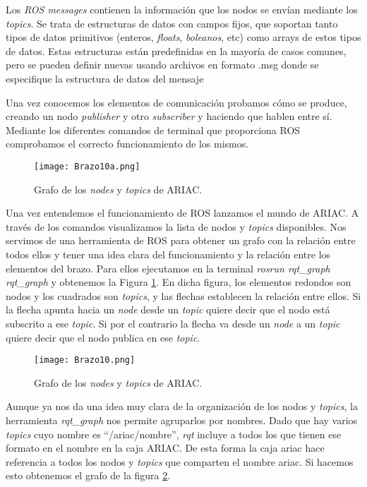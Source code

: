 Los \textit{ROS messages} contienen la información que los nodos se envían mediante los \textit{topics}. Se trata de estructuras de datos con campos fijos, que soportan tanto tipos de datos primitivos (enteros, \textit{floats}, \textit{boleanos}, etc) como arrays de estos tipos de datos. Estas estructuras están predefinidas en la mayoría de casos comunes, pero se pueden definir nuevas usando archivos en formato .msg donde se especifique la estructura de datos del mensaje

Una vez conocemos los elementos de comunicación probamos cómo se produce, creando un nodo \textit{publisher} y otro \textit{subscriber} y haciendo que hablen entre sí. Mediante los diferentes comandos de terminal que proporciona ROS comprobamos el correcto funcionamiento de los mismos. 

\begin{figure}[ht]
	\centering\texttt{[image: Brazo10a.png]}
	\caption{Grafo de los \textit{nodes} y \textit{topics} de ARIAC.}
	\label{fig:ariacgraph1}
\end{figure}

Una vez entendemos el funcionamiento de ROS lanzamos el mundo de ARIAC. A través de los comandos visualizamos la lista de nodos y \textit{topics} disponibles. Nos servimos de una herramienta de ROS para obtener un grafo con la relación entre todos ellos y tener una idea clara del funcionamiento y la relación entre los elementos del brazo. Para ellos ejecutamos en la terminal \textit{rosrun rqt\_graph rqt\_graph} y obtenemos la Figura \ref{fig:ariacgraph1}. En dicha figura, los elementos redondos son nodos y los cuadrados son \textit{topics}, y las flechas establecen la relación entre ellos. Si la flecha apunta hacia un \textit{node} desde un \textit{topic} quiere decir que el nodo está subscrito a ese \textit{topic}. Si por el contrario la flecha va desde un \textit{node} a un \textit{topic} quiere decir que el nodo publica en ese \textit{topic}.

\begin{figure}[hb]
	\centering\texttt{[image: Brazo10.png]}
	\caption{Grafo de los \textit{nodes} y \textit{topics} de ARIAC.}
	\label{fig:ariacgraph2}
\end{figure}

Aunque ya nos da una idea muy clara de la organización de los nodos y \textit{topics}, la herramienta \textit{rqt\_graph} nos permite agruparlos por nombres. Dado que hay varios \textit{topics} cuyo nombre es “/ariac/nombre”, \textit{rqt} incluye a todos los que tienen ese formato en el nombre en la caja ARIAC. De esta forma la caja ariac hace referencia a todos los nodos y \textit{topics} que comparten el nombre ariac. Si hacemos esto obtenemos el grafo de la figura \ref{fig:ariacgraph2}.

